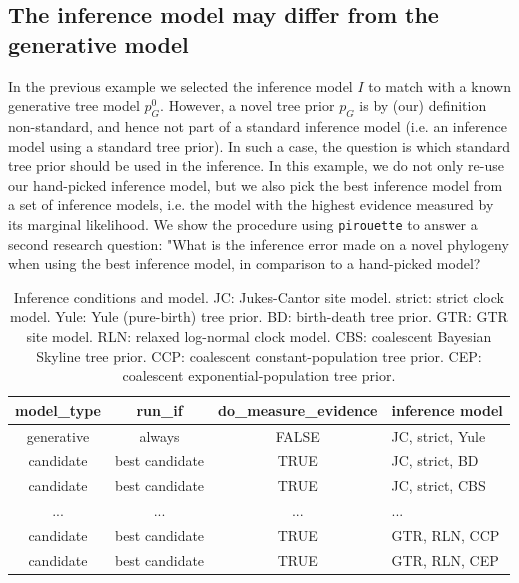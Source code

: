 \subsection{The inference model may differ from the generative model}

In the previous example we selected the inference model $\mathit{I}$ to match 
with a known generative tree model $\mathit{p_{G}^0}$.
However, a novel tree prior $\mathit{p_{G}}$ is by (our) definition
non-standard, and hence not part of a standard inference 
model (i.e. an inference model using a standard tree prior).
In such a case, the question is which standard tree prior should be used in 
the inference. In this example, we do not only re-use our hand-picked 
inference model, but we also pick the best inference model from a set of 
inference models, i.e.  the model with 
the highest evidence measured by its marginal likelihood. 
We show the procedure using \verb;pirouette; to answer a second 
research question: "What is the inference error made on a novel phylogeny 
when using the best inference model, in comparison to a hand-picked model?

\begin{table}
  \begin{tabular}{ | c | c | c | l | }
    \hline
    \textbf{model\_type} &
    \textbf{run\_if} &
    \textbf{do\_measure\_evidence} & 
    \textbf{inference model} \\ 
    \hline
    generative & always         & FALSE & JC, strict, Yule \\
    candidate  & best candidate & TRUE  & JC, strict, BD   \\
    candidate  & best candidate & TRUE  & JC, strict, CBS  \\
    ...        & ...            & ...   & ...              \\
    candidate  & best candidate & TRUE  & GTR, RLN, CCP    \\
    candidate  & best candidate & TRUE  & GTR, RLN, CEP    \\
    \hline
  \end{tabular}
  \caption{
    Inference conditions and model.
    JC: Jukes-Cantor site model.
    strict: strict clock model.
    Yule: Yule (pure-birth) tree prior.
    BD: birth-death tree prior.
    GTR: GTR site model.
    RLN: relaxed log-normal clock model.
    CBS: coalescent Bayesian Skyline tree prior.
    CCP: coalescent constant-population tree prior.
    CEP: coalescent exponential-population tree prior.
  }
  \label{tab:RQ2}
\end{table}

